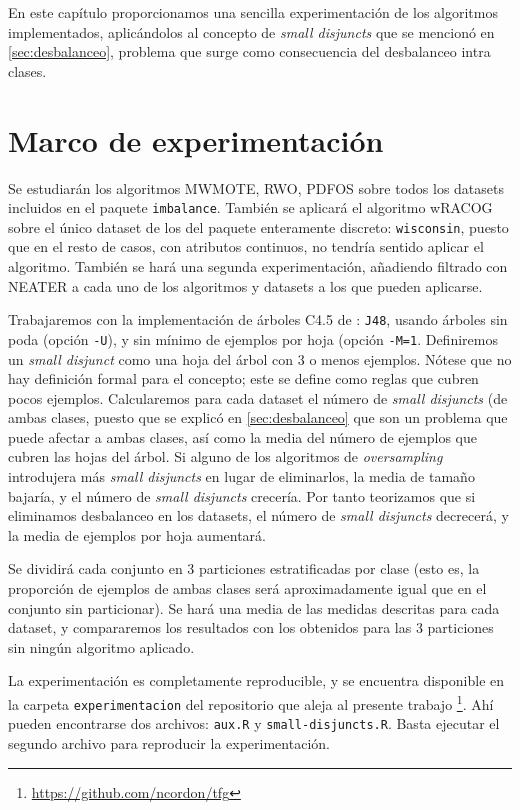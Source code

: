 En este capítulo proporcionamos una sencilla experimentación de los algoritmos implementados, aplicándolos al concepto de 
\textit{small disjuncts} que se mencionó en \ref{sec:desbalanceo}, problema que surge como consecuencia del desbalanceo
intra clases.

\section{Marco de experimentación}
Se estudiarán los algoritmos MWMOTE, RWO, PDFOS sobre todos los datasets incluidos en el paquete \texttt{imbalance}. 
También se aplicará el algoritmo wRACOG sobre el único dataset de los del paquete enteramente discreto: \texttt{wisconsin},
puesto que en el resto de casos, con atributos continuos, no tendría sentido aplicar el algoritmo. También se hará una 
segunda experimentación, añadiendo filtrado con NEATER a cada uno de los algoritmos y datasets a los que pueden aplicarse.

Trabajaremos con la implementación de árboles C4.5 de : \texttt{J48}, usando árboles sin poda 
(opción \texttt{-U}), y sin mínimo de ejemplos por hoja (opción \texttt{-M=1}. 
Definiremos un \textit{small disjunct} como una hoja del árbol con 3 o menos ejemplos. Nótese 
que no hay definición formal para el concepto; este se define como reglas que cubren pocos ejemplos. Calcularemos para 
cada dataset el número de \textit{small disjuncts} (de ambas clases, puesto que se explicó en \ref{sec:desbalanceo} que 
son un problema que puede afectar a ambas clases, así como la media del número de ejemplos que cubren las hojas del árbol.
Si alguno de los algoritmos de \textit{oversampling} introdujera más \textit{small disjuncts} en lugar de eliminarlos, 
la media de tamaño bajaría, y el número de \textit{small disjuncts} crecería. Por tanto teorizamos que si eliminamos 
desbalanceo en los datasets, el número de \textit{small disjuncts} decrecerá, y la media de ejemplos por hoja aumentará.

Se dividirá cada conjunto en 3 particiones estratificadas por clase (esto es, la proporción de ejemplos de ambas
clases será aproximadamente igual que en el conjunto sin particionar). Se hará una media de las medidas descritas para cada
dataset, y compararemos los resultados con los obtenidos para las 3 particiones sin ningún algoritmo aplicado.

La experimentación es completamente reproducible, y se encuentra disponible en la carpeta \texttt{experimentacion} del 
repositorio que aleja al presente trabajo \footnote{\url{https://github.com/ncordon/tfg}}.
Ahí pueden encontrarse dos archivos: \texttt{aux.R} y \texttt{small-disjuncts.R}. Basta ejecutar el segundo archivo
para reproducir la experimentación.


